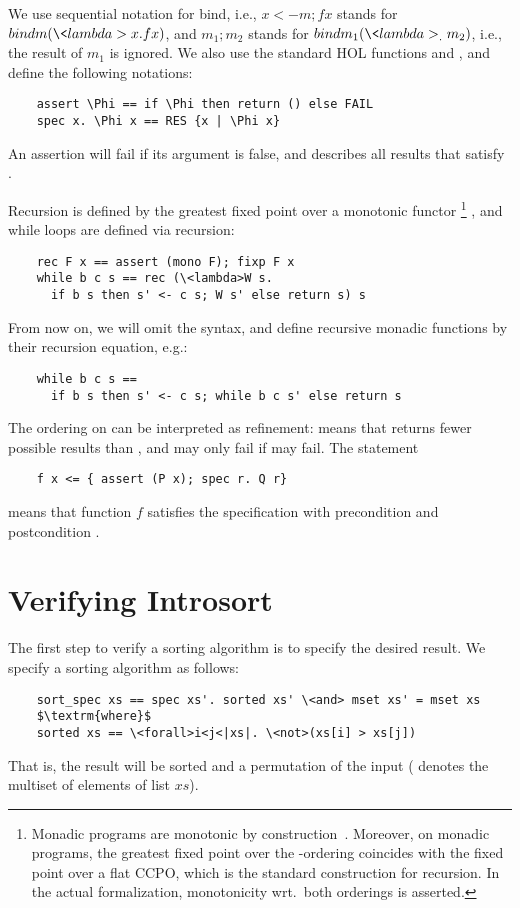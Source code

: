\documentclass[sigplan,10pt,anonymous,review]{acmart}\settopmatter{printfolios=true,printccs=false,printacmref=false}
\theoremstyle{definition}
\begin{document}
  We use sequential notation for bind, i.e., \is$x<-m; f x$ stands for \is$bind m (\<lambda>x. f x)$,
  and \is$m_1; m_2$ stands for \is$bind m_1 (\<lambda>_. m_2)$, i.e., the result of \is$m_1$ is ignored.
  We also use the standard HOL functions  and , and define the following notations:
  \begin{lstlisting}
    assert \Phi == if \Phi then return () else FAIL
    spec x. \Phi x == RES {x | \Phi x}
  \end{lstlisting}
  An assertion will fail if its argument is false, and  describes all results that satisfy \is{\Phi}.

  Recursion is defined by the greatest fixed point over a monotonic functor \footnote{Monadic
    programs are monotonic by construction~\cite{Kr10}. Moreover, on monadic programs, the greatest fixed point over the -ordering
    coincides with the fixed point over a flat CCPO, which is the standard construction for recursion. In the actual
    formalization, monotonicity wrt.\ both orderings is asserted. }
  , and while loops are defined via recursion:
  \begin{lstlisting}
    rec F x == assert (mono F); fixp F x
    while b c s == rec (\<lambda>W s.
      if b s then s' <- c s; W s' else return s) s
  \end{lstlisting}
  From now on, we will omit the  syntax, and define recursive monadic functions by their recursion equation, e.g.:
  \begin{lstlisting}
    while b c s ==
      if b s then s' <- c s; while b c s' else return s
  \end{lstlisting}

  The ordering on  can be interpreted as refinement:  means
  that  returns fewer possible results than , and may only fail if  may fail.
  The statement
  \begin{lstlisting}
    f x <= { assert (P x); spec r. Q r}
  \end{lstlisting}
  means that function $f$ satisfies the specification with precondition  and postcondition .

\section{Verifying Introsort}
  The first step to verify a sorting algorithm is to specify the desired result.
  We specify a sorting algorithm as follows:
  \begin{lstlisting}
    sort_spec xs == spec xs'. sorted xs' \<and> mset xs' = mset xs
    $\textrm{where}$
    sorted xs == \<forall>i<j<|xs|. \<not>(xs[i] > xs[j])
  \end{lstlisting}
  That is, the result will be sorted and a permutation of the input ( denotes the multiset of elements of list $xs$).
\end{document}
